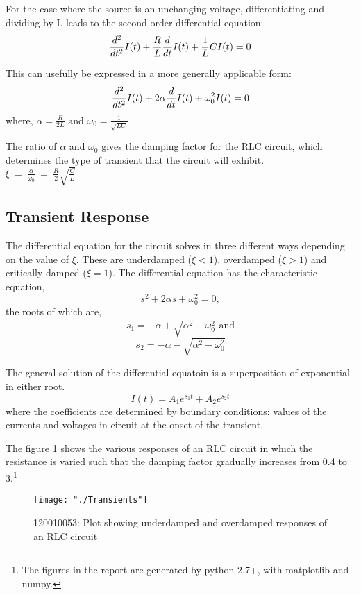 \documentclass[12pt, twosides]{article}
\newcommand{\rollno}{120010053}
\newcommand{\curr}{I}
\newcommand{\res}{R}
\newcommand{\capc}{C}
\newcommand{\ind}{L}
\newcommand{\der}[1]{
\ifnum#1=1
	\frac{d}{dt}
\else
	\frac{d^#1}{dt^#1}
\fi
}
\begin{document}
		\noindent
		For the case where the source is an unchanging voltage, differentiating and dividing by L leads to the second order differential equation:
		\[ \der{2} \curr(t) + \frac{\res}{\ind} \der{1} \curr(t) + \frac{1}{\ind}{\capc} \curr(t) = 0 \]
		
		\noindent
		This can usefully be expressed in a more generally applicable form:
		\[ \der{2} \curr(t) + 2 \alpha \der{1} \curr(t) + \omega_0^2 \curr(t) = 0 \]
		where, \( \alpha = \frac{\res}{2 \ind} \text{ and } \omega_0 = \frac{1}{\sqrt{\ind \capc}} \)

		The ratio of \(\alpha\) and \(\omega_0\)  gives the damping factor for the RLC circuit, which determines the type of transient that the circuit  will exhibit.\\
		\(\xi \ = \ \frac{\alpha}{\omega_0} \ = \ \frac{R}{2} \sqrt{\frac{\capc}{\ind}} \)
		
		\subsection{Transient Response}
			The differential equation for the circuit solves in three different ways depending on the value of \(\xi\).
			These are underdamped (\(\xi < 1\)), overdamped (\(\xi > 1\)) and critically damped (\(\xi = 1\)). The differential equation has the characteristic equation,
			\[ s^2 + 2 \alpha s + \omega_0^2 =0, \]
			the roots of which are,
			\[ s_1 = - \alpha + \sqrt{\alpha^2 - \omega_0^2} \text{ and}\]
			\[ s_2 = - \alpha - \sqrt{\alpha^2 - \omega_0^2 }\]
			
			The general solution of the differential equatoin is a superposition of exponential in either root.
			\[ \curr(t) = A_1 e^{s_1 t} + A_2 e^{s_2 t} \]
			where the coefficients are determined by boundary conditions: values of the currents and voltages in circuit at the onset of the transient.
			
			\noindent
			The figure \ref{fig:transients} shows the various responses of an RLC circuit in which the resistance is varied such that the damping factor gradually increases from 0.4 to 3.\footnote{The figures in the report are generated by python-2.7+, with matplotlib and numpy.}
			\begin{figure}[H]
			\centering
				\texttt{[image: "./Transients"]}
			\caption{\rollno: Plot showing underdamped and overdamped responses of an RLC circuit}
			\label{fig:transients}
			\end{figure}
			
			
			
\end{document}

